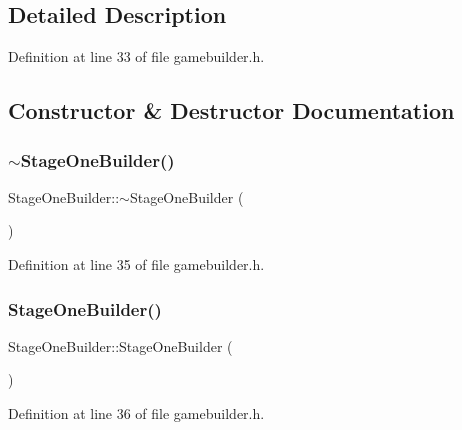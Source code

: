 \subsection{Detailed Description}


Definition at line 33 of file gamebuilder.\+h.



\subsection{Constructor \& Destructor Documentation}
\mbox{\label{class_stage_one_builder_a1008b1e1d473b4c3e3db2fca1122d4b0}} 
\subsubsection{\texorpdfstring{$\sim$\+Stage\+One\+Builder()}{~StageOneBuilder()}}
{\footnotesize\ttfamily Stage\+One\+Builder\+::$\sim$\+Stage\+One\+Builder (\begin{DoxyParamCaption}{ }\end{DoxyParamCaption})\hspace{0.3cm}{\ttfamily [inline]}}



Definition at line 35 of file gamebuilder.\+h.

\mbox{\label{class_stage_one_builder_aaeaf7f5af709b6530e95db25bab3af13}} 
\subsubsection{\texorpdfstring{Stage\+One\+Builder()}{StageOneBuilder()}}
{\footnotesize\ttfamily Stage\+One\+Builder\+::\+Stage\+One\+Builder (\begin{DoxyParamCaption}{ }\end{DoxyParamCaption})\hspace{0.3cm}{\ttfamily [inline]}}



Definition at line 36 of file gamebuilder.\+h.



